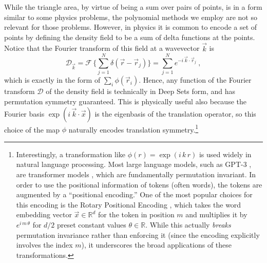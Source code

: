 \documentclass[10pt]{article}
\newcommand{\secbreak}{\bigskip{\centering\footnotesize $\triangle~~~\triangle~~~\triangle$\par}\bigskip\noindent}
\begin{document}
\secbreak
While the triangle area, by virtue of being a sum over pairs of points, is in a form similar to some physics problems, the polynomial methods we employ are not so relevant for those problems.
However, in physics it is common to encode a set of points by defining the density field to be a sum of delta functions at the points.
Notice that the Fourier transform of this field at a wavevector $\vec{k}$ is
\begin{equation}
    \mathcal{D}_{\vec{k}} = \mathcal{F} \,\bigg\{
        \sum_{j=1}^{N} \delta(\vec{r} - \vec{r}_j)
    \bigg\}
    = \sum_{j=1}^{N} e^{-i \, \vec{k} \cdot \vec{r}_j}~,
\end{equation}
which is exactly in the form of $\sum_i \phi(\vec{r}_i)$.
Hence, any function of the Fourier transform $\mathcal{D}$ of the density field is technically in Deep Sets form, and has permutation symmetry guaranteed.
This is physically useful also because the Fourier basis $\exp (i\, \vec{k}\cdot\vec{x})$ is the eigenbasis of the translation operator, so this choice of the map $\phi$ naturally encodes translation symmetry.\footnote{%
%
Interestingly, a transformation like $\phi(r) = \exp(i\,k\,r)$ is used widely in natural language processing.
Most large language models, such as GPT-3 \citep{Brown2020GPT3}, are transformer models \citep{Vaswani2017Attention}, which are fundamentally permutation invariant.
In order to use the positional information of tokens (often words), the tokens are augmented by a ``positional encoding.''
One of the most popular choices for this encoding is the Rotary Positional Encoding \citep[RoPE;][]{Su2024Roformer}, which takes the word embedding vector $\vec{x} \in \mathbb{R}^{d}$ for the token in position $m$ and multiplies it by $e^{i \, m \, \theta}$ for $d/2$ preset constant values $\theta \in \mathbb{R}$.
While this actually \emph{breaks} permutation invariance rather than enforcing it (since the encoding explicitly involves the index $m$), it underscores the broad applications of these transformations.
}
\end{document}
